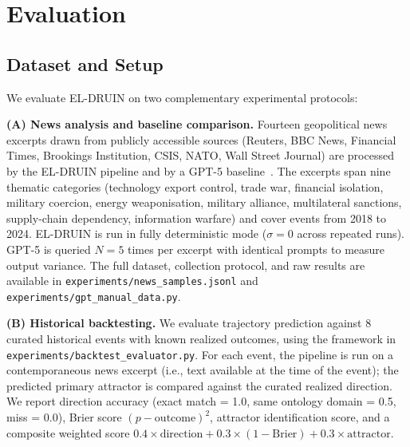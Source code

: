 \documentclass{llncs}
\begin{document}
\section{Evaluation}

\subsection{Dataset and Setup}
\label{sec:methodology}

We evaluate EL-DRUIN on two complementary experimental protocols:

\textbf{(A) News analysis and baseline comparison.}
Fourteen geopolitical news excerpts drawn from publicly accessible sources
(Reuters, BBC News, Financial Times, Brookings Institution, CSIS, NATO, Wall
Street Journal) are processed by the EL-DRUIN pipeline and by a GPT-5
baseline~\cite{openai2025gpt5}. The excerpts span nine thematic categories
(technology export control, trade war, financial isolation, military coercion,
energy weaponisation, military alliance, multilateral sanctions, supply-chain
dependency, information warfare) and cover events from 2018 to 2024. EL-DRUIN
is run in fully deterministic mode ($\sigma = 0$ across repeated runs). GPT-5
is queried $N = 5$ times per excerpt with identical prompts to measure output
variance. The full dataset, collection protocol, and raw results are available
in \texttt{experiments/news\_samples.jsonl} and
\texttt{experiments/gpt\_manual\_data.py}.

\textbf{(B) Historical backtesting.}
We evaluate trajectory prediction against 8 curated historical events with known
realized outcomes, using the framework in \texttt{experiments/backtest\_evaluator.py}.
For each event, the pipeline is run on a contemporaneous news excerpt (i.e., text
available at the time of the event); the predicted primary attractor is compared
against the curated realized direction. We report direction accuracy (exact match
= 1.0, same ontology domain = 0.5, miss = 0.0), Brier score
$(p - \text{outcome})^2$, attractor identification score, and a composite weighted
score $0.4 \times \text{direction} + 0.3 \times (1 - \text{Brier}) + 0.3 \times
\text{attractor}$.
\end{document}
